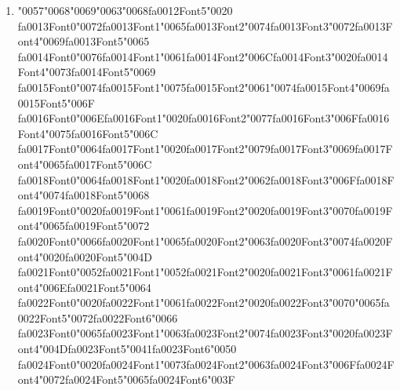 \documentclass[12pt]{article}
\begin{document}
\begin{enumerate}[label=Q\arabic*.]
\item {\char"0057}{\char"0068}{\char"0069}{\char"0063}{\char"0068}{\csname fa0012Font5\endcsname\char"0020} {\csname fa0013Font0\endcsname\char"0072}{\csname fa0013Font1\endcsname\char"0065}{\csname fa0013Font2\endcsname\char"0074}{\csname fa0013Font3\endcsname\char"0072}{\csname fa0013Font4\endcsname\char"0069}{\csname fa0013Font5\endcsname\char"0065} {\csname fa0014Font0\endcsname\char"0076}{\csname fa0014Font1\endcsname\char"0061}{\csname fa0014Font2\endcsname\char"006C}{\csname fa0014Font3\endcsname\char"0020}{\csname fa0014Font4\endcsname\char"0073}{\csname fa0014Font5\endcsname\char"0069} {\csname fa0015Font0\endcsname\char"0074}{\csname fa0015Font1\endcsname\char"0075}{\csname fa0015Font2\endcsname\char"0061}{\char"0074}{\csname fa0015Font4\endcsname\char"0069}{\csname fa0015Font5\endcsname\char"006F} {\csname fa0016Font0\endcsname\char"006E}{\csname fa0016Font1\endcsname\char"0020}{\csname fa0016Font2\endcsname\char"0077}{\csname fa0016Font3\endcsname\char"006F}{\csname fa0016Font4\endcsname\char"0075}{\csname fa0016Font5\endcsname\char"006C} {\csname fa0017Font0\endcsname\char"0064}{\csname fa0017Font1\endcsname\char"0020}{\csname fa0017Font2\endcsname\char"0079}{\csname fa0017Font3\endcsname\char"0069}{\csname fa0017Font4\endcsname\char"0065}{\csname fa0017Font5\endcsname\char"006C} {\csname fa0018Font0\endcsname\char"0064}{\csname fa0018Font1\endcsname\char"0020}{\csname fa0018Font2\endcsname\char"0062}{\csname fa0018Font3\endcsname\char"006F}{\csname fa0018Font4\endcsname\char"0074}{\csname fa0018Font5\endcsname\char"0068} {\csname fa0019Font0\endcsname\char"0020}{\csname fa0019Font1\endcsname\char"0061}{\csname fa0019Font2\endcsname\char"0020}{\csname fa0019Font3\endcsname\char"0070}{\csname fa0019Font4\endcsname\char"0065}{\csname fa0019Font5\endcsname\char"0072} {\csname fa0020Font0\endcsname\char"0066}{\csname fa0020Font1\endcsname\char"0065}{\csname fa0020Font2\endcsname\char"0063}{\csname fa0020Font3\endcsname\char"0074}{\csname fa0020Font4\endcsname\char"0020}{\csname fa0020Font5\endcsname\char"004D} {\csname fa0021Font0\endcsname\char"0052}{\csname fa0021Font1\endcsname\char"0052}{\csname fa0021Font2\endcsname\char"0020}{\csname fa0021Font3\endcsname\char"0061}{\csname fa0021Font4\endcsname\char"006E}{\csname fa0021Font5\endcsname\char"0064} {\csname fa0022Font0\endcsname\char"0020}{\csname fa0022Font1\endcsname\char"0061}{\csname fa0022Font2\endcsname\char"0020}{\csname fa0022Font3\endcsname\char"0070}{\char"0065}{\csname fa0022Font5\endcsname\char"0072}{\csname fa0022Font6\endcsname\char"0066} {\csname fa0023Font0\endcsname\char"0065}{\csname fa0023Font1\endcsname\char"0063}{\csname fa0023Font2\endcsname\char"0074}{\csname fa0023Font3\endcsname\char"0020}{\csname fa0023Font4\endcsname\char"004D}{\csname fa0023Font5\endcsname\char"0041}{\csname fa0023Font6\endcsname\char"0050} {\csname fa0024Font0\endcsname\char"0020}{\csname fa0024Font1\endcsname\char"0073}{\csname fa0024Font2\endcsname\char"0063}{\csname fa0024Font3\endcsname\char"006F}{\csname fa0024Font4\endcsname\char"0072}{\csname fa0024Font5\endcsname\char"0065}{\csname fa0024Font6\endcsname\char"003F}

\end{enumerate}
\end{document}

